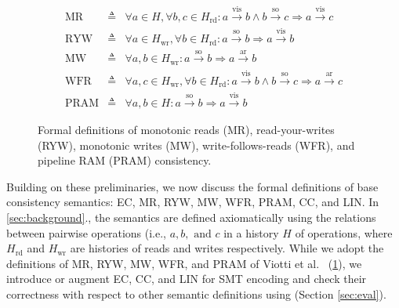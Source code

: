   \begin{figure}
	  \vspace{-0.2in}
  \begin{minipage}{3.5in}
    \begin{eqnarray*}
	    \text{MR} & \triangleq & \forall a \in H, \forall b, c \in H_\text{rd}: a
	    \xrightarrow{\text{vis}} b \land b \xrightarrow{\text{so}} c \Rightarrow
	    a \xrightarrow{\text{vis}} c
      \\
      \text{RYW} & \triangleq & \forall a \in H_\text{wr}, \forall b \in
      H_\text{rd}: a \xrightarrow{\text{so}} b \Rightarrow a
      \xrightarrow{\text{vis}} b
      \\
      \text{MW} & \triangleq & \forall a, b \in H_\text{wr}: a
      \xrightarrow{\text{so}} b \Rightarrow a \xrightarrow{\text{ar}} b
      \\
      \text{WFR} & \triangleq & \forall a, c \in H_\text{wr}, \forall b \in
      H_\text{rd}: a \xrightarrow{\text{vis}} b \land b
      \xrightarrow{\text{so}} c \Rightarrow a \xrightarrow{\text{ar}} c
      \\
      \text{PRAM} & \triangleq & \forall a, b \in H: a \xrightarrow{\text{so}}
      b \Rightarrow a \xrightarrow{\text{vis}} b
    \end{eqnarray*}
	  \end{minipage}
    \caption{Formal definitions of monotonic reads (MR), read-your-writes
      (RYW), monotonic writes (MW), write-follows-reads (WFR), and pipeline
    RAM (PRAM) consistency.}\label{fig:semdef}
  \end{figure}
Building on these preliminaries, we now discuss the formal definitions of
base consistency semantics: EC, MR, RYW, MW, WFR, PRAM, CC, and LIN. In
\cref{sec:background}., the semantics are defined axiomatically using the relations between
pairwise operations (i.e., $a, b, \textrm{ and } c$ in a history $H$ of
  operations, where $H_\text{rd}$ and $H_\text{wr}$ are histories of reads and
  writes respectively.
  While we adopt the definitions of MR, RYW, MW, WFR,
  and PRAM of Viotti et al.~\cite{viotti2016consistency} (\cref{fig:semdef}),
  we introduce or augment EC, CC, and LIN for SMT encoding and
  check their correctness with respect to other semantic definitions
  using \sysname{}
  (Section \ref{sec:eval}).

